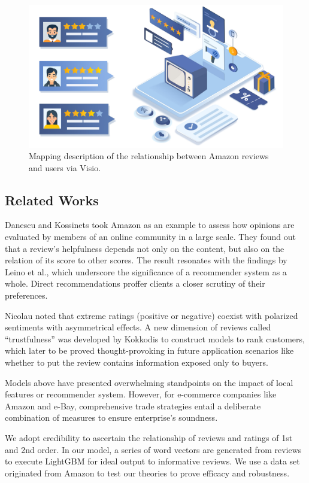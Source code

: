 \documentclass[12pt]{article}%
\begin{document}
\begin{figure}[H]
	\centering
	\includegraphics[width=.7\textwidth]{pic/protect.jpg}%
	\caption{Mapping description of the relationship between Amazon reviews and users via Visio.}\label{Suzanne}%
\end{figure}



\subsection{Related Works}

Danescu and Kossinets\cite{232} took Amazon as an example to assess how opinions are evaluated by members of an online community in a large scale. They found out that a review’s helpfulness depends not only on the content, but also on the relation of its score to other scores. The result resonates with the findings by Leino et al.\cite{236}, which underscore the significance of a recommender system as a whole. Direct recommendations proffer clients a closer scrutiny of their preferences.

Nicolau\cite{233} noted that extreme ratings (positive or negative) coexist with polarized sentiments with asymmetrical effects. A new dimension of reviews called “trustfulness” was developed by Kokkodis\cite{234} to construct models to rank customers, which later to be proved thought-provoking in future application scenarios like whether to put the review contains information exposed only to buyers. 

Models above have presented overwhelming standpoints on the impact of local features or recommender system. However, for e-commerce companies like Amazon and e-Bay, comprehensive trade strategies entail a deliberate combination of measures to ensure enterprise’s soundness.

We adopt credibility to ascertain the relationship of reviews and ratings of 1st and 2nd order. In our model, a series of word vectors are generated from reviews to execute LightGBM for ideal output to informative reviews. We use a data set originated from Amazon to test our theories to prove efficacy and robustness.
	
\end{document}
